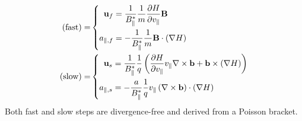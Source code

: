 \begin{subequations}
	\begin{align}
		(\text{fast}) = & \left\{ \begin{aligned}
			\mathbf{u}_f & = \frac{1}{B_\parallel^\ast} \frac{1}{m} \frac{\partial H}{\partial v_\parallel} \mathbf{B} \\
			a_{\parallel, f} & = -\frac{1}{B_\parallel^\ast} \frac{1}{m} \mathbf{B} \cdot \left( \nabla H \right)
		\end{aligned} \right. \label{split step fast}\\
		(\text{slow}) = &  \left\{ \begin{aligned}
			\mathbf{u}_s & = \frac{1}{B_\parallel^\ast} \frac{1}{q} \left( \frac{\partial H}{\partial v_\parallel} v_\parallel \nabla \times \mathbf{b} + \mathbf{b} \times \left(\nabla H\right) \right) \\
			a_{\parallel, s} & = - \frac{a}{B_\parallel^\ast} \frac{1}{q} v_\parallel \left( \nabla \times \mathbf{b} \right) \cdot \left( \nabla H \right)
		\end{aligned} \right. \label{split step slow}
	\end{align}
\end{subequations}
Both fast and slow steps are divergence-free and derived from a Poisson bracket.

